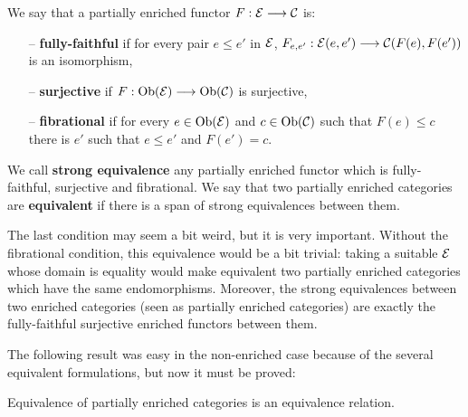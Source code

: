 \begin{defi}
We say that a partially enriched functor $F : \mathcal{E} \longrightarrow \mathcal{C}$ is:
\begin{itemize}
	\item[--] \textbf{fully-faithful} if for every pair $e \leq e'$ in $\mathcal{E}$, $F_{e,e'} : \mathcal{E}(e,e') \longrightarrow \mathcal{C}(F(e),F(e'))$ is an isomorphism,
	\item[--] \textbf{surjective} if $F : \text{Ob}(\mathcal{E}) \longrightarrow \text{Ob}(\mathcal{C})$ is surjective,
	\item[--] \textbf{fibrational} if for every $e \in \text{Ob}(\mathcal{E})$ and $c\in\text{Ob}(\mathcal{C})$ such that $F(e) \leq c$ there is $e'$ such that $e \leq e'$ and $F(e') =c$.
\end{itemize}
We call \textbf{strong equivalence} any partially enriched functor which is fully-faithful, surjective and fibrational. We say that two partially enriched categories are \textbf{equivalent} if there is a span of strong equivalences between them.
\end{defi}

The last condition may seem a bit weird, but it is very important. Without the fibrational condition, this equivalence would be a bit trivial: taking a suitable $\mathcal{E}$ whose domain is equality would make equivalent two partially enriched categories which have the same endomorphisms. Moreover, the strong equivalences between two enriched categories (seen as partially enriched categories) are exactly the fully-faithful surjective enriched functors between them.

The following result was easy in the non-enriched case because of the several equivalent formulations, but now it must be proved:

\begin{prop}
Equivalence of partially enriched categories is an equivalence relation.
\end{prop}


